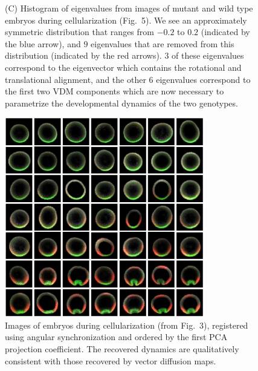 \documentclass{pnastwo}
\newcommand{\fig}[0]{Fig.}
\begin{document}
\begin{figure}
{%
(C) Histogram of eigenvalues from images of mutant and wild type embryos during cellularization (\fig~5).
We see an approximately symmetric distribution that ranges from $-0.2$ to $0.2$ (indicated by the blue arrow), and $9$ eigenvalues that are removed from this distribution (indicated by the red arrows). $3$ of these eigenvalues correspond to the eigenvector which contains the rotational and translational alignment, and the other $6$ eigenvalues correspond to the first two VDM components which are now necessary to parametrize the developmental dynamics of the two genotypes.}
\label{fig:eval_spectra}
\end{figure}

\begin{figure}
\includegraphics[width=8.7cm]{PCA_ordered}
\caption{Images of embryos during cellularization (from \fig~3), registered using angular synchronization \cite{singer2011angular} and ordered by the first PCA projection coefficient. The recovered dynamics are qualitatively consistent with those recovered by vector diffusion maps. }
\label{fig:PCA_data1}
\end{figure}
\end{document}
